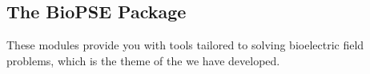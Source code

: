 \subsection{The BioPSE Package}
\label{sec:biopsepackage}


These modules provide you with tools tailored to solving bioelectric field
problems, which is the theme of the  we have developed.


\begin{description}
\item[] \missing{}
\item[] \missing{}
\item[] \missing{}
\end{description}


